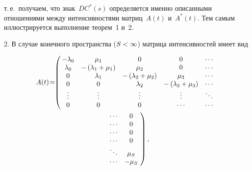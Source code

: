 \begin{multicols}{2}
\vspace*{-6pt}

\noindent
т.\,е.\ получаем, что знак~$DC^*(s)$ определяется именно описанными отношениями 
между интенсивностями матриц~$A(t)$ и~$A^*(t)$. Тем самым иллюстрируется 
выполнение теорем~1 и~2.

\vspace*{2pt}

2. В случае конечного пространства ($S \hm< \infty$) матрица интенсивностей имеет 
вид

\vspace*{-6pt}

\noindent
\begin{multline*}
\!\!\!A(t)\! =\!\!
\left(\!\!
\begin{array}{ccccc}
-\lambda_0                 & \mu_1     & 0                                 & 0     & \cdots   \\
 \lambda_0                 & -\left( \lambda_1 +\mu_1\right)                         
& \mu_2                             & 0                                                 
& \cdots     \\
 0                         & \lambda_1                                               
& -\left( \lambda_2 +\mu_2\right)   & \mu_3                                             
& \cdots     \\
 0                         & 0                                                       
& \lambda_2                         & -\left( \lambda_3 +\mu_3\right)                   
& \cdots  \\
\vdots                     & \vdots                                                  
& \vdots                            & \vdots                                            
& \ddots  \\
0                          & 0                                                       
& 0                                 & \cdots                                            
& \cdots  
\end{array}\!
\right.\hspace*{-1.5842pt}\\
\left.
\begin{array}{cc}
 \cdots  & 0      \\
 \cdots  & 0      \\
 \cdots  & 0      \\
  \cdots  & 0      \\
 \ddots  & \mu_S  \\
 \cdots  & -\mu_S
\end{array}\!
\right),
\end{multline*}


\end{multicols}
